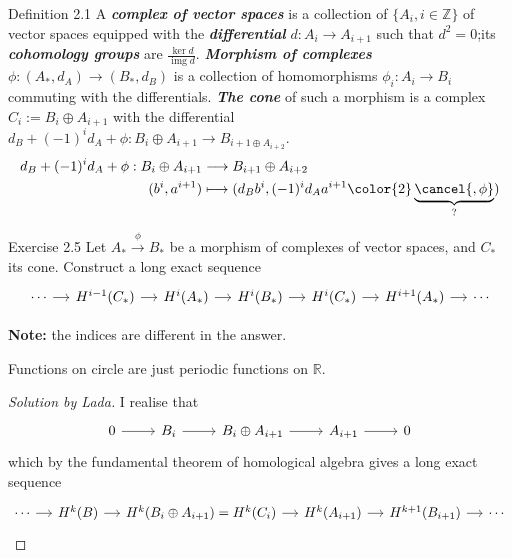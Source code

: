 \begin{thing3}{Definition 2.1}\label{def:2.1}\leavevmode
	A \textit{\textbf{complex of vector spaces}} is a collection of \(\{A_i,i \in \mathbb{Z}\}\) of vector spaces equipped with the \textit{\textbf{differential}} \(d:A_i\to A_{i+1}\) such that \(d^2=0\);its \textit{\textbf{cohomology groups}} are \(\frac{\ker d}{\operatorname{img}d}\). \textit{\textbf{Morphism of complexes}} \(\phi:(A_*,d_A)\to (B_*,d_B)\) is a collection of homomorphisms \(\phi_i:A_i\to B_i\) commuting with the differentials. \textit{\textbf{The cone}} of such a morphism is a complex \(C_i:=B_i \oplus A_{i+1}\) with the differential \(d_B+(-1)^id_A+\phi:B_i \oplus A_{i+1}\to B_{i+1\oplus A_{i+2}}\).
\begin{align*}
	d_B+(-1)^id_A+\phi:B_i\oplus A_{i+1} &\longrightarrow B_{i+1}\oplus A_{i+2} \\
	(b^i,a^{i+1}) &\longmapsto (d_B b^i, (-1)^i d_A a^{i+1}{\color{2}\underbrace{\cancel{, \phi}}_{?}})
\end{align*}

\begin{thing4}{Exercise 2.5}\label{exer:2.5}\leavevmode
Let \(A_* \xrightarrow{\phi}B_*\) be a morphism of complexes of vector spaces, and \(C_*\) its cone. Construct a long exact sequence
\[\begin{tikzcd}[column sep=small]
	\cdots\arrow[r]&H^{i-1}(C_*)\arrow[r]&H^{i}(A_*)\arrow[r]&H^{i}(B_*)\arrow[r]&H^{i}(C_*)\arrow[r]&H^{i+1}(A_*)\arrow[r]&\cdots
\end{tikzcd}\]

\textbf{Note:} the indices are different in the answer.
\end{thing4}

\begin{upshot}\leavevmode
Functions on circle are just periodic functions on \(\mathbb{R}\).
\end{upshot}

\begin{proof}[Solution by Lada]\leavevmode
I realise that
\[\begin{tikzcd}0\arrow[r]&B_i\arrow[r]&B_i \oplus  A_{i+1}\arrow[r]&A_{i+1}\arrow[r]&0\end{tikzcd}\]
which by the fundamental theorem of homological algebra gives a long exact sequence
\[\begin{tikzcd}[column sep=small]
	\cdots\arrow[r]&H^{k}(B)\arrow[r]&H^{k}(B_i \oplus  A_{i+1})=H^{k}(C_i)\arrow[r]&H^{k}(A_{i+1})\arrow[r]&H^{k+1}(B_{i+1})\arrow[r]&\cdots
\end{tikzcd}\]
\end{proof}


\end{thing3}
